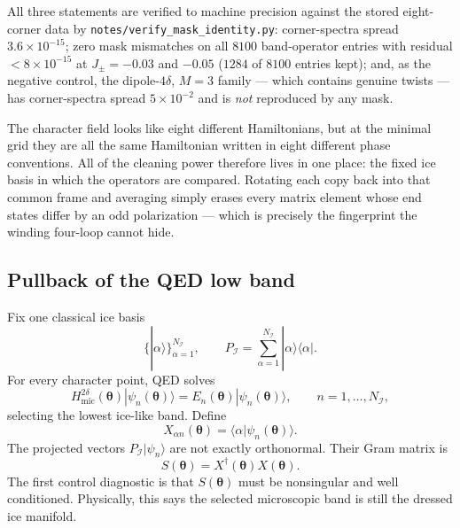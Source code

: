 \documentclass[11pt,letterpaper]{article}
\newcommand{\Jpm}{J_{\pm}}
\newcommand{\btheta}{\bm \theta}
\newcommand{\ice}{\mathcal I}
\newcommand{\Hmic}{H_{\mathrm{mic}}}
\theoremstyle{plain}
\theoremstyle{definition}
\begin{document}
All three statements are verified to machine precision against the stored
eight-corner data by \texttt{notes/verify\_mask\_identity.py}: corner-spectra
spread $3.6\times10^{-15}$; zero mask mismatches on all $8100$ band-operator
entries with residual $<8\times10^{-15}$ at $\Jpm=-0.03$ and $-0.05$
($1284$ of $8100$ entries kept); and, as the negative control, the
dipole-$4\delta$, $M=3$ family --- which contains genuine twists --- has
corner-spectra spread $5\times10^{-2}$ and is \emph{not} reproduced by any
mask.

\begin{intuition}
The character field looks like eight different Hamiltonians, but at the
minimal grid they are all the same Hamiltonian written in eight different
phase conventions.  All of the cleaning power therefore lives in one place:
the fixed ice basis in which the operators are compared.  Rotating each copy
back into that common frame and averaging simply erases every matrix element
whose end states differ by an odd polarization --- which is precisely the
fingerprint the winding four-loop cannot hide.
\end{intuition}

\subsection{Pullback of the QED low band}

Fix one classical ice basis
\[
\{|\alpha\rangle\}_{\alpha=1}^{N_{\ice}},\qquad
P_\ice=\sum_{\alpha=1}^{N_\ice}|\alpha\rangle\langle\alpha|.
\]
For every character point, QED solves
\begin{equation}
\Hmic^{2\delta}(\btheta)|\psi_n(\btheta)\rangle
=E_n(\btheta)|\psi_n(\btheta)\rangle,
\qquad n=1,\ldots,N_\ice ,
\label{eq:qed_low_eigenproblem}
\end{equation}
selecting the lowest ice-like band.  Define
\begin{equation}
X_{\alpha n}(\btheta)=\langle\alpha|\psi_n(\btheta)\rangle .
\label{eq:X_projection_new}
\end{equation}
The projected vectors $P_\ice|\psi_n\rangle$ are not exactly orthonormal.
Their Gram matrix is
\begin{equation}
S(\btheta)=X^\dagger(\btheta)X(\btheta).
\label{eq:gram_matrix_new}
\end{equation}
The first control diagnostic is that $S(\btheta)$ must be nonsingular and well
conditioned.  Physically, this says the selected microscopic band is still the
dressed ice manifold.
\end{document}

